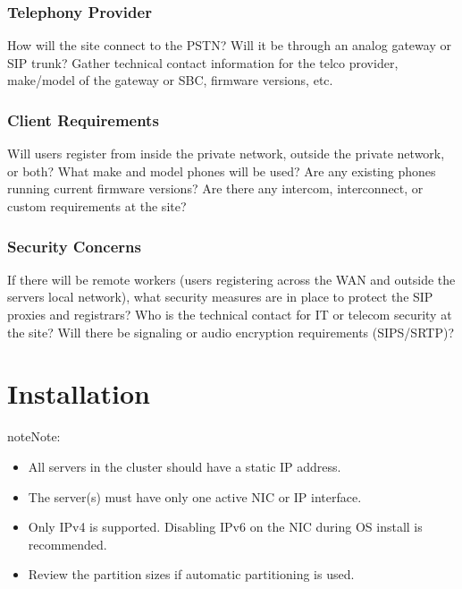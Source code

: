 \documentclass[letterpaper,10pt,english]{sphinxmanual}
\begin{document}
\subsection{Telephony Provider}
\label{\detokenize{planning:telephony-provider}}
How will the site connect to the PSTN? Will it be through an analog gateway or SIP trunk? Gather technical contact information for the telco provider, make/model of the gateway or SBC, firmware versions, etc.


\subsection{Client Requirements}
\label{\detokenize{planning:client-requirements}}
Will users register from inside the private network, outside the private network, or both? What make and model phones will be used? Are any existing phones running current firmware versions? Are there any intercom, interconnect, or custom requirements at the site?


\subsection{Security Concerns}
\label{\detokenize{planning:security-concerns}}
If there will be remote workers (users registering across the WAN and outside the servers local network), what security measures are in place to protect the SIP proxies and registrars?
Who is the technical contact for IT or telecom security at the site?
Will there be signaling or audio encryption requirements (SIPS/SRTP)?

\ignorespaces 

\chapter{Installation}
\label{\detokenize{installation:installation}}\label{\detokenize{installation:rpm-installation}}\label{\detokenize{installation:index-0}}\label{\detokenize{installation::doc}}
\begin{sphinxadmonition}{note}{Note:}\begin{itemize}
\item {} 
All servers in the cluster should have a static IP address.

\item {} 
The server(s) must have only one active NIC or IP interface.

\item {} 
Only IPv4 is supported. Disabling IPv6 on the NIC during OS install is recommended.

\item {} 
Review the partition sizes if automatic partitioning is used.

\end{itemize}
\end{sphinxadmonition}
\end{document}
